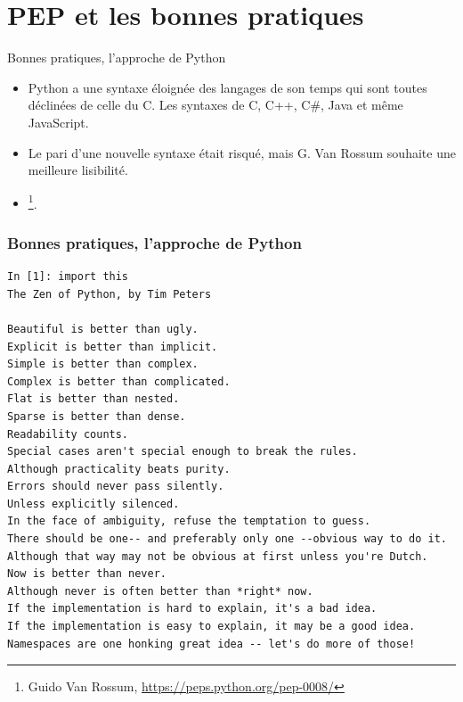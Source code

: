 \documentclass{beamer}
\begin{document}
    \section{PEP et les bonnes pratiques}\label{sec:pep-good-pratices}

    \begin{frame}{Bonnes pratiques, l'approche de Python}
        \begin{itemize}
            \item Python a une syntaxe éloignée des langages de son temps qui sont toutes déclinées de celle du C. Les syntaxes de C, C++, C\#, Java et même JavaScript.
            \item Le pari d'une nouvelle syntaxe était risqué, mais G. Van Rossum souhaite une meilleure lisibilité.
            \item {}\footnote{Guido Van Rossum, \url{https://peps.python.org/pep-0008/}}.
        \end{itemize}
    \end{frame}

    \begin{frame}[fragile]
        \transdissolve
        \frametitle{Bonnes pratiques, l'approche de Python}
        \begin{lstlisting}
In [1]: import this
The Zen of Python, by Tim Peters

Beautiful is better than ugly.
Explicit is better than implicit.
Simple is better than complex.
Complex is better than complicated.
Flat is better than nested.
Sparse is better than dense.
Readability counts.
Special cases aren't special enough to break the rules.
Although practicality beats purity.
Errors should never pass silently.
Unless explicitly silenced.
In the face of ambiguity, refuse the temptation to guess.
There should be one-- and preferably only one --obvious way to do it.
Although that way may not be obvious at first unless you're Dutch.
Now is better than never.
Although never is often better than *right* now.
If the implementation is hard to explain, it's a bad idea.
If the implementation is easy to explain, it may be a good idea.
Namespaces are one honking great idea -- let's do more of those!
        \end{lstlisting}
    \end{frame}
\end{document}
